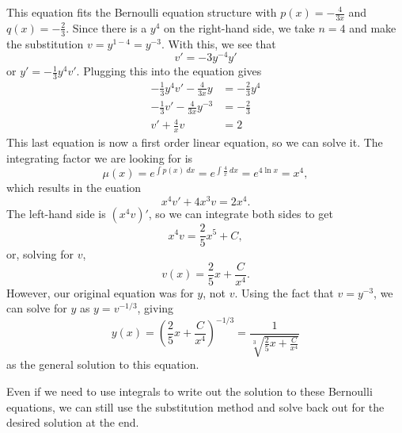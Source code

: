 \documentclass{ximera}
\begin{document}
\begin{exampleSol}
    This equation fits the Bernoulli equation structure with $p(x) = -\frac{4}{3x}$ and $q(x) = -\frac{2}{3}$. Since there is a $y^4$ on the right-hand side, we take $n=4$ and make the substitution $v = y^{1-4} = y^{-3}$. With this, we see that
    \begin{equation*}
        v' = -3 y^{-4} y'
    \end{equation*}
    or $y' = -\frac{1}{3}y^4 v'$. Plugging this into the equation gives
    \begin{equation*}
        \begin{split}
            -\frac{1}{3} y^4 v' - \frac{4}{3x}y &= -\frac{2}{3}y^4 \\
            -\frac{1}{3} v' - \frac{4}{3x} y^{-3} &= -\frac{2}{3} \\
            v' + \frac{4}{x} v &= 2
        \end{split}
    \end{equation*}
    This last equation is now a first order linear equation, so we can solve it. The integrating factor we are looking for is 
    \begin{equation*}
        \mu(x) = e^{\int p(x)\ dx} = e^{\int \frac{4}{x}\ dx} = e^{4\ln{x}} = x^4, 
    \end{equation*}
    which results in the euation
    \begin{equation*}
        x^4 v' + 4x^3 v = 2x^4.
    \end{equation*}
    The left-hand side is $(x^4v)'$, so we can integrate both sides to get
    \begin{equation*}
        x^4 v = \frac{2}{5}x^5 + C,
    \end{equation*}
    or, solving for $v$, 
    \begin{equation*}
        v(x) = \frac{2}{5} x + \frac{C}{x^4}.
    \end{equation*}
    However, our original equation was for $y$, not $v$. Using the fact that $v = y^{-3}$, we can solve for $y$ as $y = v^{-1/3}$, giving
    \begin{equation*}
        y(x) = \left(\frac{2}{5}x + \frac{C}{x^4}\right)^{-1/3} = \frac{1}{\sqrt[3]{\frac{2}{5}x + \frac{C}{x^4}}}
    \end{equation*}
    as the general solution to this equation. 
\end{exampleSol}

Even if we need to use integrals to write out the solution to these Bernoulli equations, we can still use the substitution method and solve back out for the desired solution at the end.
\end{document}
